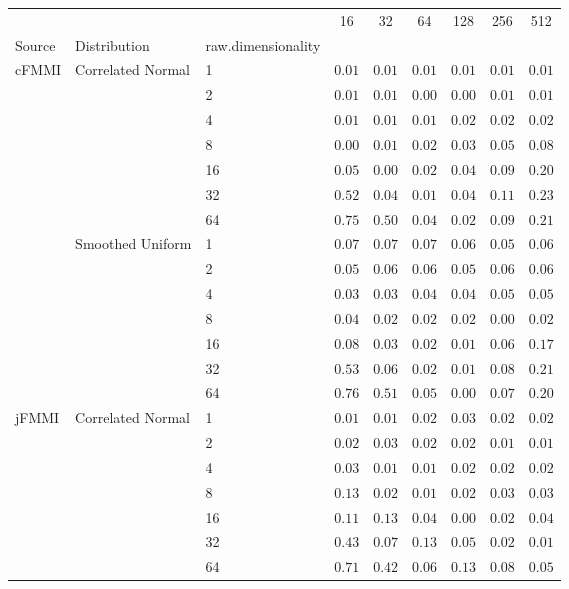 \begin{tabular}{lllcccccc}
\toprule
 &  &  & 16 & 32 & 64 & 128 & 256 & 512 \\
Source & Distribution & raw.dimensionality &  &  &  &  &  &  \\
\midrule
\multirow[l]{14}{*}{cFMMI} & \multirow[l]{7}{*}{Correlated Normal} & 1 & $0.01$ & $0.01$ & $0.01$ & $0.01$ & $0.01$ & $0.01$ \\
 &  & 2 & $0.01$ & $0.01$ & $0.00$ & $0.00$ & $0.01$ & $0.01$ \\
 &  & 4 & $0.01$ & $0.01$ & $0.01$ & $0.02$ & $0.02$ & $0.02$ \\
 &  & 8 & $0.00$ & $0.01$ & $0.02$ & $0.03$ & $0.05$ & $0.08$ \\
 &  & 16 & $0.05$ & $0.00$ & $0.02$ & $0.04$ & $0.09$ & $0.20$ \\
 &  & 32 & $0.52$ & $0.04$ & $0.01$ & $0.04$ & $0.11$ & $0.23$ \\
 &  & 64 & $0.75$ & $0.50$ & $0.04$ & $0.02$ & $0.09$ & $0.21$ \\
\cmidrule{2-9}
 & \multirow[l]{7}{*}{Smoothed Uniform} & 1 & $0.07$ & $0.07$ & $0.07$ & $0.06$ & $0.05$ & $0.06$ \\
 &  & 2 & $0.05$ & $0.06$ & $0.06$ & $0.05$ & $0.06$ & $0.06$ \\
 &  & 4 & $0.03$ & $0.03$ & $0.04$ & $0.04$ & $0.05$ & $0.05$ \\
 &  & 8 & $0.04$ & $0.02$ & $0.02$ & $0.02$ & $0.00$ & $0.02$ \\
 &  & 16 & $0.08$ & $0.03$ & $0.02$ & $0.01$ & $0.06$ & $0.17$ \\
 &  & 32 & $0.53$ & $0.06$ & $0.02$ & $0.01$ & $0.08$ & $0.21$ \\
 &  & 64 & $0.76$ & $0.51$ & $0.05$ & $0.00$ & $0.07$ & $0.20$ \\
\cmidrule{1-9} \cmidrule{2-9}
\multirow[l]{14}{*}{jFMMI} & \multirow[l]{7}{*}{Correlated Normal} & 1 & $0.01$ & $0.01$ & $0.02$ & $0.03$ & $0.02$ & $0.02$ \\
 &  & 2 & $0.02$ & $0.03$ & $0.02$ & $0.02$ & $0.01$ & $0.01$ \\
 &  & 4 & $0.03$ & $0.01$ & $0.01$ & $0.02$ & $0.02$ & $0.02$ \\
 &  & 8 & $0.13$ & $0.02$ & $0.01$ & $0.02$ & $0.03$ & $0.03$ \\
 &  & 16 & $0.11$ & $0.13$ & $0.04$ & $0.00$ & $0.02$ & $0.04$ \\
 &  & 32 & $0.43$ & $0.07$ & $0.13$ & $0.05$ & $0.02$ & $0.01$ \\
 &  & 64 & $0.71$ & $0.42$ & $0.06$ & $0.13$ & $0.08$ & $0.05$ \\

\end{tabular}
